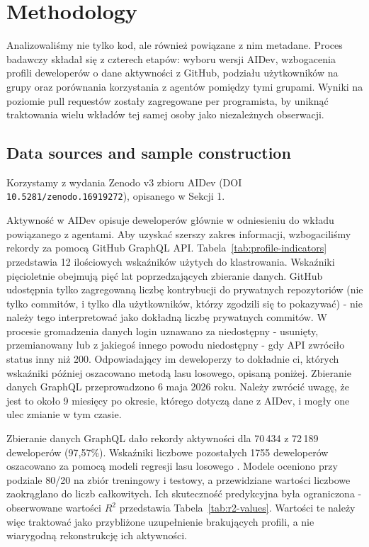 \section{Methodology}\label{sec:method}

Analizowaliśmy nie tylko kod, ale również powiązane z nim metadane. Proces badawczy składał się z czterech etapów: wyboru wersji AIDev, wzbogacenia profili deweloperów o dane aktywności z GitHub, podziału użytkowników na grupy oraz porównania korzystania z agentów pomiędzy tymi grupami. Wyniki na poziomie pull requestów zostały zagregowane per programista, by uniknąć traktowania wielu wkładów tej samej osoby jako niezależnych obserwacji.

\subsection{Data sources and sample construction}

Korzystamy z wydania Zenodo v3 zbioru AIDev (DOI \texttt{10.5281/zenodo.16919272}), opisanego w Sekcji 1.

Aktywność w AIDev opisuje deweloperów głównie w odniesieniu do wkładu powiązanego z agentami. Aby uzyskać szerszy zakres informacji, wzbogaciliśmy rekordy za pomocą GitHub GraphQL API. Tabela~\ref{tab:profile-indicators} przedstawia 12 ilościowych wskaźników użytych do klastrowania. Wskaźniki pięcioletnie obejmują pięć lat poprzedzających zbieranie danych. GitHub udostępnia tylko zagregowaną liczbę kontrybucji do prywatnych repozytoriów (nie tylko commitów, i tylko dla użytkowników, którzy zgodzili się to pokazywać) - nie należy tego interpretować jako dokładną liczbę prywatnych commitów. W procesie gromadzenia danych login uznawano za niedostępny - usunięty, przemianowany lub z jakiegoś innego powodu niedostępny - gdy API zwróciło status inny niż 200. Odpowiadający im deweloperzy to dokładnie ci, których wskaźniki później oszacowano metodą lasu losowego, opisaną poniżej. Zbieranie danych GraphQL przeprowadzono 6 maja 2026 roku. Należy zwrócić uwagę, że jest to około 9 miesięcy po okresie, którego dotyczą dane z AIDev, i mogły one ulec zmianie w tym czasie.

Zbieranie danych GraphQL dało rekordy aktywności dla 70\,434 z 72\,189 deweloperów (97,57\%). Wskaźniki liczbowe pozostałych 1755 deweloperów oszacowano za pomocą modeli regresji lasu losowego \cite{breiman2001random}. Modele oceniono przy podziale 80/20 na zbiór treningowy i testowy, a przewidziane wartości liczbowe zaokrąglano do liczb całkowitych. Ich skuteczność predykcyjna była ograniczona - obserwowane wartości $R^2$ przedstawia Tabela~\ref{tab:r2-values}. Wartości te należy więc traktować jako przybliżone uzupełnienie brakujących profili, a nie wiarygodną rekonstrukcję ich aktywności.

